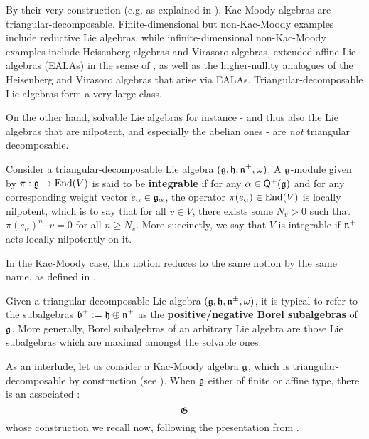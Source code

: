         \begin{example}
            By their very construction (e.g. as explained in \cite[Chapter 1]{kac_infinite_dimensional_lie_algebras}), Kac-Moody algebras are triangular-decomposable. Finite-dimensional but non-Kac-Moody examples include reductive Lie algebras, while infinite-dimensional non-Kac-Moody examples include Heisenberg algebras and Virasoro algebras, extended affine Lie algebras (EALAs) in the sense of \cite{neher_lectures_on_EALAs}, as well as the higher-nullity analogues of the Heisenberg and Virasoro algebras that arise via EALAs. Triangular-decomposable Lie algebras form a very large class.

            On the other hand, solvable Lie algebras for instance - and thus also the Lie algebras that are nilpotent, and especially the abelian ones - are \textit{not} triangular decomposable.
        \end{example}

        \begin{definition} \label{def: integrable_modules_over_triangular_decomposable_lie_algebras}
            Consider a triangular-decomposable Lie algebra $(\mathfrak{g}, \mathfrak{h}, \mathfrak{n}^{\pm}, \omega)$. A $\mathfrak{g}$-module given by $\pi: \mathfrak{g} \to \operatorname{End}(V)$ is said to be \textbf{integrable} if for any $\alpha \in \mathsf{Q}^+(\mathfrak{g})$ and for any corresponding weight vector $e_{\alpha} \in \mathfrak{g}_{\alpha}$, the operator $\pi(e_{\alpha}) \in \operatorname{End}(V)$ is locally nilpotent, which is to say that for all $v \in V$, there exists some $N_v > 0$ such that $\pi(e_{\alpha})^n \cdot v = 0$ for all $n \geq N_v$. More succinctly, we say that $V$ is integrable if $\mathfrak{n}^+$ acts locally nilpotently on it.
        \end{definition}
        In the Kac-Moody case, this notion reduces to the same notion by the same name, as defined in \cite[Chapter 3]{kac_infinite_dimensional_lie_algebras}.

        Given a triangular-decomposable Lie algebra $(\mathfrak{g}, \mathfrak{h}, \mathfrak{n}^{\pm}, \omega)$, it is typical to refer to the subalgebras $\mathfrak{b}^{\pm} := \mathfrak{h} \oplus \mathfrak{n}^{\pm}$ as the \textbf{positive/negative Borel subalgebras} of $\mathfrak{g}$. More generally, Borel subalgebras of an arbitrary Lie algebra are those Lie subalgebras which are maximal amongst the solvable ones.
            
        As an interlude, let us consider a Kac-Moody algebra $\mathfrak{g}$, which is triangular-decomposable by construction (see \cite[Theorem 1.2]{kac_infinite_dimensional_lie_algebras}). When $\mathfrak{g}$ either of finite or affine type, there is an associated :
            $$\mathfrak{G}$$
        whose construction we recall now, following the presentation from \cite{perrin_kac_moody_algebras}.
        

